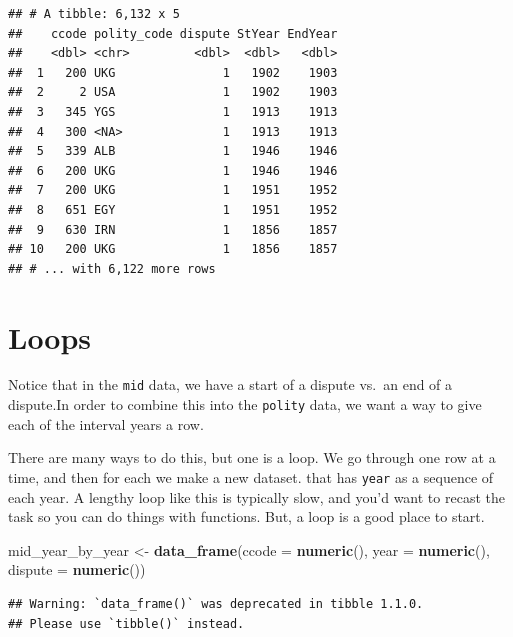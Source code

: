 \documentclass[
]{book}
\newenvironment{Shaded}{\begin{snugshade}}{\end{snugshade}}
\newcommand{\DataTypeTok}[1]{\textcolor[rgb]{0.13,0.29,0.53}{#1}}
\newcommand{\KeywordTok}[1]{\textcolor[rgb]{0.13,0.29,0.53}{\textbf{#1}}}
\newcommand{\NormalTok}[1]{#1}
\newcommand{\StringTok}[1]{\textcolor[rgb]{0.31,0.60,0.02}{#1}}
\theoremstyle{definition}
\theoremstyle{definition}
\theoremstyle{definition}
\theoremstyle{definition}
\theoremstyle{remark}
\begin{document}
\begin{verbatim}
## # A tibble: 6,132 x 5
##    ccode polity_code dispute StYear EndYear
##    <dbl> <chr>         <dbl>  <dbl>   <dbl>
##  1   200 UKG               1   1902    1903
##  2     2 USA               1   1902    1903
##  3   345 YGS               1   1913    1913
##  4   300 <NA>              1   1913    1913
##  5   339 ALB               1   1946    1946
##  6   200 UKG               1   1946    1946
##  7   200 UKG               1   1951    1952
##  8   651 EGY               1   1951    1952
##  9   630 IRN               1   1856    1857
## 10   200 UKG               1   1856    1857
## # ... with 6,122 more rows
\end{verbatim}

\hypertarget{loops}{%
\section{Loops}\label{loops}}

Notice that in the \texttt{mid} data, we have a start of a dispute vs.~an end of a dispute.In order to combine this into the \texttt{polity} data, we want a way to give each of the interval years a row.

There are many ways to do this, but one is a loop. We go through one row at a time, and then for each we make a new dataset. that has \texttt{year} as a sequence of each year. A lengthy loop like this is typically slow, and you'd want to recast the task so you can do things with functions. But, a loop is a good place to start.

\begin{Shaded}
\begin{Highlighting}[]
\NormalTok{mid_year_by_year <-}\StringTok{ }\KeywordTok{data_frame}\NormalTok{(}\DataTypeTok{ccode =} \KeywordTok{numeric}\NormalTok{(),}
                               \DataTypeTok{year =} \KeywordTok{numeric}\NormalTok{(),}
                               \DataTypeTok{dispute =} \KeywordTok{numeric}\NormalTok{())}
\end{Highlighting}
\end{Shaded}

\begin{verbatim}
## Warning: `data_frame()` was deprecated in tibble 1.1.0.
## Please use `tibble()` instead.
\end{verbatim}
\end{document}
